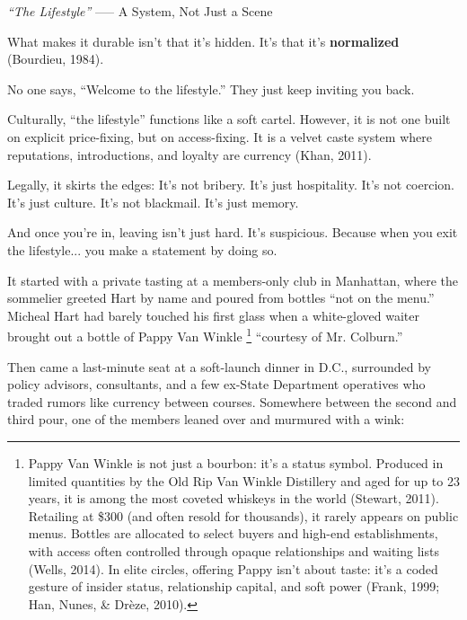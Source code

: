 \begin{HistoricalSidebar}{\textit{“The Lifestyle”} --— A System, Not Just a Scene}
  \medskip

  What makes it durable isn’t that it’s hidden.  It’s that it’s \textbf{normalized} (Bourdieu, 1984).

  \medskip

  No one says, “Welcome to the lifestyle.” They just keep inviting you back.

  \medskip

  Culturally, “the lifestyle” functions like a soft cartel. However, it is not one built on explicit price-fixing, 
  but on access-fixing. It is a velvet caste system where reputations, introductions, and loyalty are currency 
  (Khan, 2011).

  \medskip

  Legally, it skirts the edges:  
  It's not bribery. It's just hospitality.  
  It's not coercion. It's just culture.  
  It's not blackmail. It's just memory.

  \medskip

  And once you’re in, leaving isn’t just hard. It’s suspicious.  
  Because when you exit the lifestyle... you make a statement by doing so.

\end{HistoricalSidebar}


\medskip

It started with a private tasting at a members-only club in Manhattan, where the sommelier greeted Hart by name and poured 
from bottles ``not on the menu.'' Micheal Hart had barely touched his first glass when a white-gloved waiter brought out a 
bottle of Pappy Van Winkle
\footnote{Pappy Van Winkle is not just a bourbon: it's a status symbol. 
Produced in limited quantities by the Old Rip Van Winkle Distillery and aged for up to 23 years, 
it is among the most coveted whiskeys in the world (Stewart, 2011). 
Retailing at \$300 (and often resold for thousands), it rarely appears on public menus. 
Bottles are allocated to select buyers and high-end establishments, with access often controlled 
through opaque relationships and waiting lists (Wells, 2014). 
In elite circles, offering Pappy isn't about taste: it's a coded gesture of insider status, 
relationship capital, and soft power (Frank, 1999; Han, Nunes, \& Drèze, 2010).}
 ``courtesy of Mr. Colburn.''

Then came a last-minute seat at a soft-launch dinner in D.C., surrounded by policy advisors, consultants, and a few ex-State 
Department operatives who traded rumors like currency between courses. Somewhere between the second and third pour, one of the 
members leaned over and murmured with a wink:  

